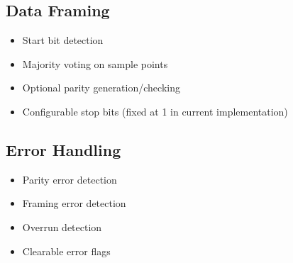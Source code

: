 \subsection{Data Framing}
\begin{itemize}
  \item Start bit detection
  \item Majority voting on sample points
  \item Optional parity generation/checking
  \item Configurable stop bits (fixed at 1 in current implementation)
\end{itemize}

\subsection{Error Handling}
\begin{itemize}
  \item Parity error detection
  \item Framing error detection
  \item Overrun detection
  \item Clearable error flags
\end{itemize}